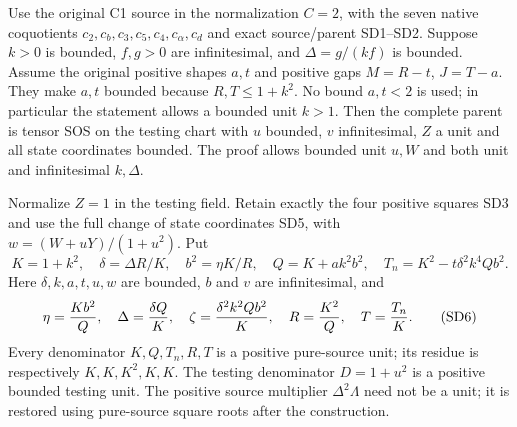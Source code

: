 Use the original C1 source in the normalization $C=2$, with the seven
native coquotients $c_2,c_b,c_3,c_5,c_4,c_\alpha,c_d$ and exact
source/parent SD1--SD2. Suppose $k>0$ is bounded, $f,g>0$ are
infinitesimal, and $\Delta=g/(kf)$ is bounded. Assume the original
positive shapes $a,t$ and positive gaps $M=R-t$, $J=T-a$.
They make $a,t$ bounded because $R,T\le1+k^2$. No bound $a,t<2$
is used; in particular the statement allows a bounded unit $k>1$.
Then the complete parent is tensor SOS on the testing chart with
$u$ bounded, $v$ infinitesimal, $Z$ a unit and all state coordinates
bounded. The proof allows bounded unit $u,W$ and both unit and
infinitesimal $k,\Delta$.

Normalize $Z=1$ in the testing field. Retain exactly the four positive
squares SD3 and use the full change of state coordinates SD5, with
$w=(W+uY)/(1+u^2)$. Put
\[
 K=1+k^2,\quad \delta=\Delta R/K,\quad b^2=\eta K/R,
 \quad Q=K+ak^2b^2,\quad T_n=K^2-t\delta^2k^4Qb^2.
\]
Here $\delta,k,a,t,u,w$ are bounded, $b$ and $v$ are infinitesimal,
and
\[
 \eta={Kb^2\over Q},\quad\Delta={\delta Q\over K},\quad
 \zeta={\delta^2k^2Qb^2\over K},\quad
 R={K^2\over Q},\quad T={T_n\over K}.\tag{SD6}
\]
Every denominator $K,Q,T_n,R,T$ is a positive pure-source unit;
its residue is respectively $K,K,K^2,K,K$.
The testing denominator $D=1+u^2$ is a positive bounded testing unit.
The positive source multiplier $\Delta^2\Lambda$ need not be a unit;
it is restored using pure-source square roots after the construction.

